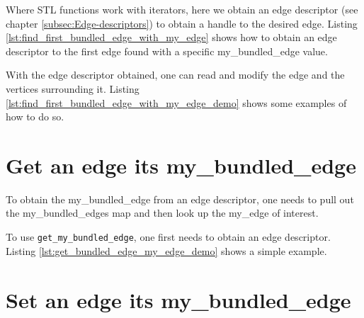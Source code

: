 Where STL functions work with iterators, here we obtain an edge descriptor
(see chapter \ref{subsec:Edge-descriptors}) 
to obtain a handle to the desired edge.
Listing \ref{lst:find_first_bundled_edge_with_my_edge}
shows how to obtain an edge descriptor to the first edge found with a specific
my_bundled_edge value.



With the edge descriptor obtained, one can read and modify the edge and
the vertices surrounding it.
Listing \ref{lst:find_first_bundled_edge_with_my_edge_demo}
shows some examples of how to do so.



\section{Get an edge its my\_bundled\_edge}
\label{subsec:get_bundled_edge_my_edge}

To obtain the my\_bundled\_edge from an edge descriptor, one needs to pull
out the my\_bundled_edges map and then look up the my\_edge of interest.



To use \verb;get_my_bundled_edge;, 
one first needs to obtain an edge descriptor.
Listing \ref{lst:get_bundled_edge_my_edge_demo} shows a simple example.



\section{Set an edge its my\_bundled\_edge}
\label{subsec:set_bundled_edge_my_edge}

